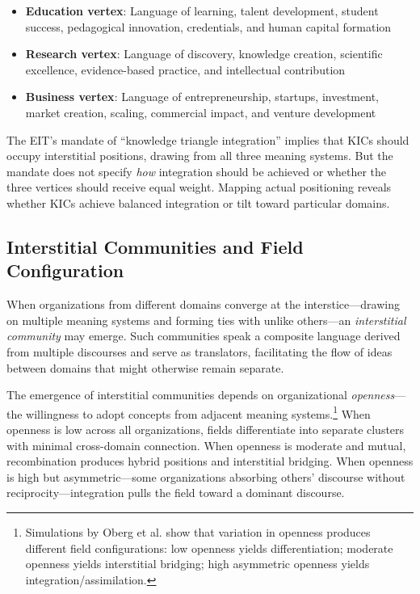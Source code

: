 \documentclass[../main.tex]{subfiles}
\begin{document}
\begin{itemize}
    \item \textbf{Education vertex}: Language of learning, talent development, student success, pedagogical innovation, credentials, and human capital formation
    \item \textbf{Research vertex}: Language of discovery, knowledge creation, scientific excellence, evidence-based practice, and intellectual contribution
    \item \textbf{Business vertex}: Language of entrepreneurship, startups, investment, market creation, scaling, commercial impact, and venture development
\end{itemize}

The EIT's mandate of ``knowledge triangle integration'' implies that KICs should occupy interstitial positions, drawing from all three meaning systems. But the mandate does not specify \textit{how} integration should be achieved or whether the three vertices should receive equal weight. Mapping actual positioning reveals whether KICs achieve balanced integration or tilt toward particular domains.

\subsection{Interstitial Communities and Field Configuration}

When organizations from different domains converge at the interstice---drawing on multiple meaning systems and forming ties with unlike others---an \textit{interstitial community} may emerge. Such communities speak a composite language derived from multiple discourses and serve as translators, facilitating the flow of ideas between domains that might otherwise remain separate.

The emergence of interstitial communities depends on organizational \textit{openness}---the willingness to adopt concepts from adjacent meaning systems.\footnote{Simulations by Oberg et al. \citeyear{oberg2017culture} show that variation in openness produces different field configurations: low openness yields differentiation; moderate openness yields interstitial bridging; high asymmetric openness yields integration/assimilation.} When openness is low across all organizations, fields differentiate into separate clusters with minimal cross-domain connection. When openness is moderate and mutual, recombination produces hybrid positions and interstitial bridging. When openness is high but asymmetric---some organizations absorbing others' discourse without reciprocity---integration pulls the field toward a dominant discourse.
\end{document}

